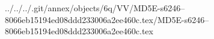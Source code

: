 ../../../.git/annex/objects/6q/VV/MD5E-s6246--8066eb15194ed08ddd233006a2ee460c.tex/MD5E-s6246--8066eb15194ed08ddd233006a2ee460c.tex